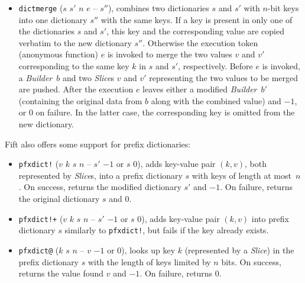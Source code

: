\documentclass[12pt,oneside]{article}
\begin{document}
\begin{itemize}
\item {\tt dictmerge} ($s$ $s'$ $n$ $e$ -- $s''$), combines two dictionaries $s$ and $s'$ with $n$-bit keys into one dictionary $s''$ with the same keys. If a key is present in only one of the dictionaries $s$ and $s'$, this key and the corresponding value are copied verbatim to the new dictionary $s''$. Otherwise the execution token (anonymous function) $e$ is invoked to merge the two values $v$ and $v'$ corresponding to the same key $k$ in $s$ and $s'$, respectively. Before $e$ is invoked, a {\em Builder\/}~$b$ and two {\em Slice}s $v$ and $v'$ representing the two values to be merged are pushed. After the execution $e$ leaves either a modified {\em Builder\/}~$b'$ (containing the original data from $b$ along with the combined value) and $-1$, or $0$ on failure. In the latter case, the corresponding key is omitted from the new dictionary.
\end{itemize}
Fift also offers some support for prefix dictionaries:
\begin{itemize}
\item {\tt pfxdict!} ($v$ $k$ $s$ $n$ -- $s'$ $-1$ or $s$ $0$), adds key-value pair $(k,v)$, both represented by {\em Slice\/}s, into a prefix dictionary $s$ with keys of length at most~$n$. On success, returns the modified dictionary $s'$ and $-1$. On failure, returns the original dictionary $s$ and $0$.
\item {\tt pfxdict!+} ($v$ $k$ $s$ $n$ -- $s'$ $-1$ or $s$ $0$), adds key-value pair $(k,v)$ into prefix dictionary $s$ similarly to {\tt pfxdict!}, but fails if the key already exists.
\item {\tt pfxdict@} ($k$ $s$ $n$ -- $v$ $-1$ or $0$), looks up key $k$ (represented by a {\em Slice\/}) in the prefix dictionary $s$ with the length of keys limited by $n$ bits. On success, returns the value found $v$ and $-1$. On failure, returns $0$.
\end{itemize}
\end{document}
